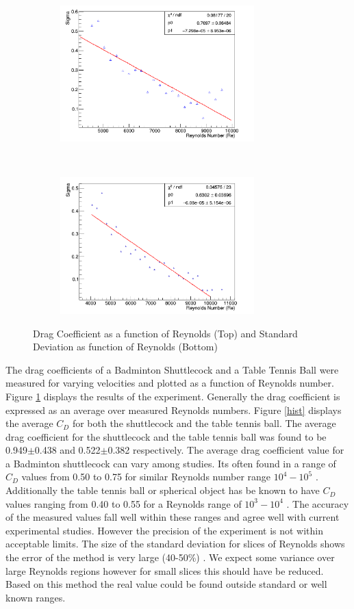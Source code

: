 \documentclass[paper=a4, fontsize=11pt, abstract=on]{scrartcl}
\numberwithin{equation}{section}		%
\numberwithin{figure}{section}			%
\numberwithin{table}{section}				%
\begin{document}
\begin{figure}[H]
\begin{subfigure}[h]{0.45\textwidth}
        \end{subfigure}
        ~~~~~
        \begin{subfigure}[h]{0.45\textwidth}
                \includegraphics[width = 7.5cm]{shutst}
                \caption{}               
        \end{subfigure}
        ~~~~~
        \begin{subfigure}[h]{0.45\textwidth}
                \includegraphics[width = 7.5cm]{pingst}
                \caption{}                
        \end{subfigure}
        \caption{Drag Coefficient as a function of Reynolds (Top) and Standard Deviation as function of Reynolds (Bottom)}
        \label{results}
\end{figure}
 The drag coefficients of a Badminton Shuttlecock and a Table Tennis Ball were measured for varying velocities and plotted as a function of Reynolds number. Figure \ref{results} displays the results of the experiment. Generally the drag coefficient is expressed as an average over measured Reynolds numbers. Figure \ref{hist} displays the average $C_D$ for both the shuttlecock and the table tennis ball. The average drag coefficient for the shuttlecock and the table tennis ball was found to be 0.949$\pm$0.438 and 0.522$\pm$0.382 respectively. The average drag coefficient value for a Badminton shuttlecock can vary among studies. Its often found in a range of $C_D$ values from 0.50 to 0.75 for similar Reynolds number range $10^4-10^5$ \cite{p1}. Additionally the table tennis ball or spherical object has be known to have $C_D$ values ranging from 0.40 to 0.55 for a Reynolds range of $10^3-10^4$ \cite{p2}. The accuracy of the measured values fall well within these ranges and agree well with current experimental studies. However the precision of the experiment is not within acceptable limits. The size of the standard deviation for slices of Reynolds shows the error of the method is very large (40-50\%) . We expect some variance over large Reynolds regions however for small slices this should have be reduced. Based on this method the real value could be found outside standard or well known ranges. 
\end{document}

